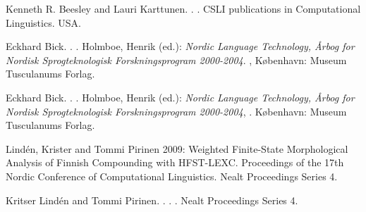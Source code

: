 \documentclass[11pt]{article}
\begin{document}
\begin{thebibliography}{}

{Kenneth R. Beesley and Lauri Karttunen}.
.
.
\newblock CSLI publications in Computational Linguistics.
\newblock USA.

{Eckhard Bick}.
.
.
\newblock Holmboe, Henrik (ed.): {\em Nordic Language Technology, Årbog for Nordisk Sprogteknologisk Forskningsprogram 2000-2004}.
,
\newblock København: Museum Tusculanums Forlag.

{Eckhard Bick}.
.
.
\newblock Holmboe, Henrik (ed.): {\em Nordic Language Technology, Årbog for Nordisk Sprogteknologisk Forskningsprogram 2000-2004},
.
\newblock København: Museum Tusculanums Forlag.



Lindén, Krister and Tommi Pirinen 2009: Weighted Finite-State Morphological Analysis of Finnish Compounding with HFST-LEXC. Proceedings of the 17th Nordic Conference of Computational Linguistics. Nealt Proceedings Series 4.

{Kritser Lindén and Tommi Pirinen}.
.
.
.
\newblock Nealt Proceedings Series 4.



\end{thebibliography}
\end{document}
